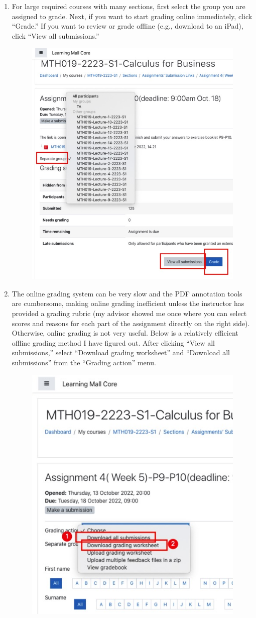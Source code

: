 \begin{enumerate}
    \item For large required courses with many sections, first select the group you are assigned to grade. Next, if you want to start grading online immediately, click “Grade.” If you want to review or grade offline (e.g., download to an iPad), click “View all submissions.”
        \begin{figure}[H]
            \centering
            \includegraphics[width=0.5\columnwidth]{author-folder/Kai.Wu/LMO_inside_submission.jpg}
        \end{figure}
    \item The online grading system can be very slow and the PDF annotation tools are cumbersome, making online grading inefficient unless the instructor has provided a grading rubric (my advisor showed me once where you can select scores and reasons for each part of the assignment directly on the right side). Otherwise, online grading is not very useful. Below is a relatively efficient offline grading method I have figured out. After clicking “View all submissions,” select “Download grading worksheet” and “Download all submissions” from the “Grading action” menu.
        \begin{figure}[H]
            \centering
            \includegraphics[width=0.5\columnwidth]{author-folder/Kai.Wu/LMO_download.jpg}

\end{figure}
\end{enumerate}
